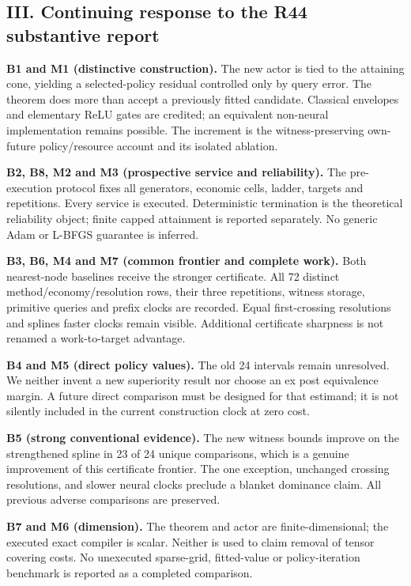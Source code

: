 \documentclass[ecta,nameyear,draft]{econsocart}
\begin{document}
\hypertarget{iii-continuing-response-to-the-r44-substantive-report}{%
\subsection{III. Continuing response to the R44 substantive
report}\label{iii-continuing-response-to-the-r44-substantive-report}}

\textbf{B1 and M1 (distinctive construction).} The new actor is tied to
the attaining cone, yielding a selected-policy residual controlled only
by query error. The theorem does more than accept a previously fitted
candidate. Classical envelopes and elementary ReLU gates are credited;
an equivalent non-neural implementation remains possible. The increment
is the witness-preserving own-future policy/resource account and its
isolated ablation.

\textbf{B2, B8, M2 and M3 (prospective service and reliability).} The
pre-execution protocol fixes all generators, economic cells, ladder,
targets and repetitions. Every service is executed. Deterministic
termination is the theoretical reliability object; finite capped
attainment is reported separately. No generic Adam or L-BFGS guarantee
is inferred.

\textbf{B3, B6, M4 and M7 (common frontier and complete work).} Both
nearest-node baselines receive the stronger certificate. All 72 distinct
method/economy/resolution rows, their three repetitions, witness
storage, primitive queries and prefix clocks are recorded. Equal
first-crossing resolutions and spline\textquotesingle s faster clocks
remain visible. Additional certificate sharpness is not renamed a
work-to-target advantage.

\textbf{B4 and M5 (direct policy values).} The old 24 intervals remain
unresolved. We neither invent a new superiority result nor choose an ex
post equivalence margin. A future direct comparison must be designed for
that estimand; it is not silently included in the current construction
clock at zero cost.

\textbf{B5 (strong conventional evidence).} The new witness bounds
improve on the strengthened spline in 23 of 24 unique comparisons, which
is a genuine improvement of this certificate frontier. The one
exception, unchanged crossing resolutions, and slower neural clocks
preclude a blanket dominance claim. All previous adverse comparisons are
preserved.

\textbf{B7 and M6 (dimension).} The theorem and actor are
finite-dimensional; the executed exact compiler is scalar. Neither is
used to claim removal of tensor covering costs. No unexecuted
sparse-grid, fitted-value or policy-iteration benchmark is reported as a
completed comparison.
\end{document}
